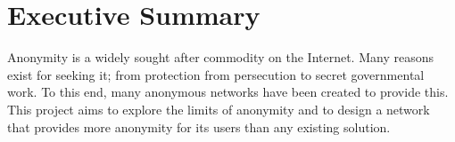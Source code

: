 \documentclass[ %
                    author={Luke Murray},
                supervisor={Dr. Simon Hollis},
                     title={Shadow Peer-to-Peer Networks},
                  subtitle={},
                    degree={MEng},
                      year={2013} ]{thesis}
\begin{document}
\chapter*{Executive Summary}

Anonymity is a widely sought after commodity on the Internet. Many reasons exist for seeking it; from protection from persecution to secret governmental work. To this end, many anonymous networks have been created to provide this. This project aims to explore the limits of anonymity and to design a network that provides more anonymity for its users than any existing solution.
\end{document}
